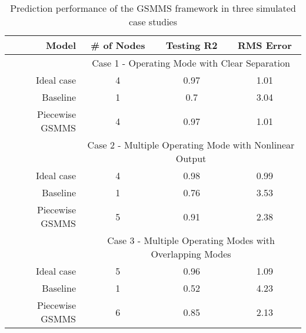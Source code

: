 \begin{table}[htbp]
  \centering
  \caption{Prediction performance of the GSMMS framework in three simulated case studies}
  \footnotesize
      \begin{tabular}{rccc}
    \toprule

          \textbf{Model } & \textbf{\# of Nodes} & \textbf{Testing R2 } & \textbf{RMS Error } \\
    \midrule
        & \multicolumn{3}{c}{Case 1 - Operating Mode with Clear Separation} \\
    \midrule
    Ideal case  & 4     & 0.97  & 1.01 \\
    Baseline & 1     & 0.7   & 3.04 \\
    Piecewise GSMMS  & 4     & 0.97  & 1.01 \\

          & \multicolumn{3}{c}{Case 2 - Multiple Operating Mode with Nonlinear Output} \\
    \midrule
    Ideal case  & 4     & 0.98  & 0.99 \\
    Baseline & 1     & 0.76  & 3.53 \\
    Piecewise GSMMS  & 5     & 0.91  & 2.38 \\

          & \multicolumn{3}{c}{Case 3 - Multiple Operating Modes with Overlapping Modes} \\
    \midrule
    Ideal case  & 5     & 0.96  & 1.09 \\
    Baseline & 1     & 0.52  & 4.23 \\
    Piecewise GSMMS  & 6     & 0.85  & 2.13 \\
    \bottomrule
    \end{tabular}%
  \label{tab:gsmms_simulated}%
\end{table}
